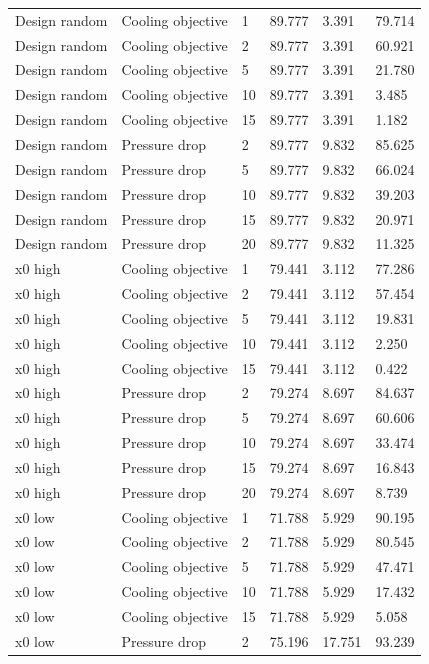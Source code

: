 \begin{longtable}{llllll}
Design random & Cooling objective & 1 & 89.777 & 3.391 & 79.714\\
Design random & Cooling objective & 2 & 89.777 & 3.391 & 60.921\\
Design random & Cooling objective & 5 & 89.777 & 3.391 & 21.780\\
Design random & Cooling objective & 10 & 89.777 & 3.391 & 3.485\\
Design random & Cooling objective & 15 & 89.777 & 3.391 & 1.182\\
Design random & Pressure drop & 2 & 89.777 & 9.832 & 85.625\\
Design random & Pressure drop & 5 & 89.777 & 9.832 & 66.024\\
Design random & Pressure drop & 10 & 89.777 & 9.832 & 39.203\\
Design random & Pressure drop & 15 & 89.777 & 9.832 & 20.971\\
Design random & Pressure drop & 20 & 89.777 & 9.832 & 11.325\\
x0 high & Cooling objective & 1 & 79.441 & 3.112 & 77.286\\
x0 high & Cooling objective & 2 & 79.441 & 3.112 & 57.454\\
x0 high & Cooling objective & 5 & 79.441 & 3.112 & 19.831\\
x0 high & Cooling objective & 10 & 79.441 & 3.112 & 2.250\\
x0 high & Cooling objective & 15 & 79.441 & 3.112 & 0.422\\
x0 high & Pressure drop & 2 & 79.274 & 8.697 & 84.637\\
x0 high & Pressure drop & 5 & 79.274 & 8.697 & 60.606\\
x0 high & Pressure drop & 10 & 79.274 & 8.697 & 33.474\\
x0 high & Pressure drop & 15 & 79.274 & 8.697 & 16.843\\
x0 high & Pressure drop & 20 & 79.274 & 8.697 & 8.739\\
x0 low & Cooling objective & 1 & 71.788 & 5.929 & 90.195\\
x0 low & Cooling objective & 2 & 71.788 & 5.929 & 80.545\\
x0 low & Cooling objective & 5 & 71.788 & 5.929 & 47.471\\
x0 low & Cooling objective & 10 & 71.788 & 5.929 & 17.432\\
x0 low & Cooling objective & 15 & 71.788 & 5.929 & 5.058\\
x0 low & Pressure drop & 2 & 75.196 & 17.751 & 93.239\\

\end{longtable}
